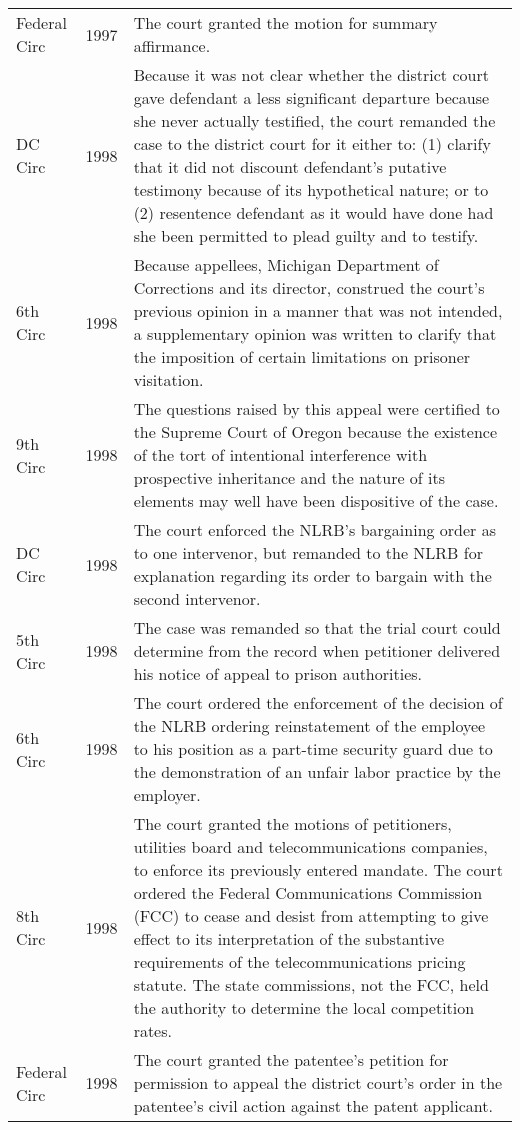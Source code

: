 \documentclass[10pt, letterpaper]{article}
\begin{document}
\begin{spacing}{1.0}
\begin{small}
\begin{longtable}[H]{llp{5in}}
    Federal Circ & 1997 & The court granted the motion for summary affirmance.\\[4pt]
    DC Circ & 1998 & Because it was not clear whether the district court gave defendant a less significant departure because she never actually testified, the court remanded the case to the district court for it either to: (1) clarify that it did not discount defendant's putative testimony because of its hypothetical nature; or to (2) resentence defendant as it would have done had she been permitted to plead guilty and to testify.\\[4pt]
    6th Circ & 1998 & Because appellees, Michigan Department of Corrections and its director, construed the court's previous opinion in a manner that was not intended, a supplementary opinion was written to clarify that the imposition of certain limitations on prisoner visitation.\\[4pt]
    9th Circ & 1998 & The questions raised by this appeal were certified to the Supreme Court of Oregon because the existence of the tort of intentional interference with prospective inheritance and the nature of its elements may well have been dispositive of the case.\\[4pt]
    DC Circ & 1998 & The court enforced the NLRB's bargaining order as to one intervenor, but remanded to the NLRB for explanation regarding its order to bargain with the second intervenor.\\[4pt]
    5th Circ & 1998 & The case was remanded so that the trial court could determine from the record when petitioner delivered his notice of appeal to prison authorities.\\[4pt]
    6th Circ & 1998 & The court ordered the enforcement of the decision of the NLRB ordering reinstatement of the employee to his position as a part-time security guard due to the demonstration of an unfair labor practice by the employer.\\[4pt]
    8th Circ & 1998 & The court granted the motions of petitioners, utilities board and telecommunications companies, to enforce its previously entered mandate. The court ordered the Federal Communications Commission (FCC) to cease and desist from attempting to give effect to its interpretation of the substantive requirements of the telecommunications pricing statute. The state commissions, not the FCC, held the authority to determine the local competition rates.\\[4pt]
    Federal Circ & 1998 & The court granted the patentee's petition for permission to appeal the district court's order in the patentee's civil action against the patent applicant.\\[4pt]

\end{longtable}
\end{small}
\end{spacing}
\end{document}
